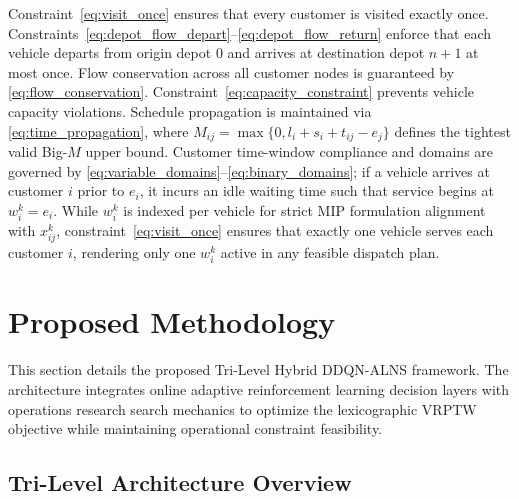 \documentclass{ieeeaccess}
\begin{document}
Constraint~\eqref{eq:visit_once} ensures that every customer is visited exactly once. Constraints~\eqref{eq:depot_flow_depart}--\eqref{eq:depot_flow_return} enforce that each vehicle departs from origin depot $0$ and arrives at destination depot $n+1$ at most once. Flow conservation across all customer nodes is guaranteed by \eqref{eq:flow_conservation}. Constraint~\eqref{eq:capacity_constraint} prevents vehicle capacity violations. Schedule propagation is maintained via \eqref{eq:time_propagation}, where $M_{ij} = \max\{0, l_i + s_i + t_{ij} - e_j\}$ defines the tightest valid Big-$M$ upper bound. Customer time-window compliance and domains are governed by \eqref{eq:variable_domains}--\eqref{eq:binary_domains}; if a vehicle arrives at customer $i$ prior to $e_i$, it incurs an idle waiting time such that service begins at $w_i^k = e_i$. While $w_i^k$ is indexed per vehicle for strict MIP formulation alignment with $x_{ij}^k$, constraint~\eqref{eq:visit_once} ensures that exactly one vehicle serves each customer $i$, rendering only one $w_i^k$ active in any feasible dispatch plan.

\section{Proposed Methodology}
\label{sec:methodology}

This section details the proposed Tri-Level Hybrid DDQN-ALNS framework. The architecture integrates online adaptive reinforcement learning decision layers with operations research search mechanics to optimize the lexicographic VRPTW objective while maintaining operational constraint feasibility.

\subsection{Tri-Level Architecture Overview}
\label{sec:arch_overview}
\end{document}
